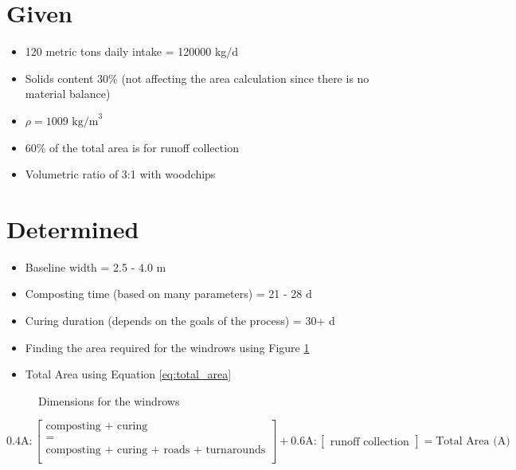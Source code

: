 \documentclass[a4paper]{article}
\begin{document}
\begin{multicols}{2}
\section*{Given}
\begin{itemize}
    \item 120 metric tons daily intake = 120000 kg/d
    \item Solids content 30\% (not affecting the area calculation since there is no material balance)
    \item $\rho = 1009\text{ kg/m}^3$
    \item 60\% of the total area is for runoff collection
    \item Volumetric ratio of 3:1 with woodchips
\end{itemize}
\columnbreak
\section*{Determined}
\begin{itemize}
    \item Baseline width = 2.5 - 4.0 m \autocite{sanin2011, metcalf2014, vesilind1988}
    \item Composting time (based on many parameters) = 21 - 28 d \autocite{metcalf2014}
    \item Curing duration (depends on the goals of the process) = 30+ d \autocite{metcalf2014}
    \item Finding the area required for the windrows using Figure \ref{fig:windrow}
    \item Total Area using Equation \ref{eq:total_area}
\end{itemize}
\end{multicols}
\begin{figure}[ht]
    \centering
    \caption{Dimensions for the windrows}
    \label{fig:windrow}
\end{figure}
\begin{equation}
    \text{{0.4A}} :
\begin{bmatrix}
    \text{composting + curing} \\
    =\\
    \text{composting + curing + roads + turnarounds} \\
\end{bmatrix}
+
\text{{0.6A}} :
\begin{bmatrix}
    \text{runoff collection}
\end{bmatrix}
=
\text{Total Area (A)}
\label{eq:total_area}
\end{equation}
\end{document}
